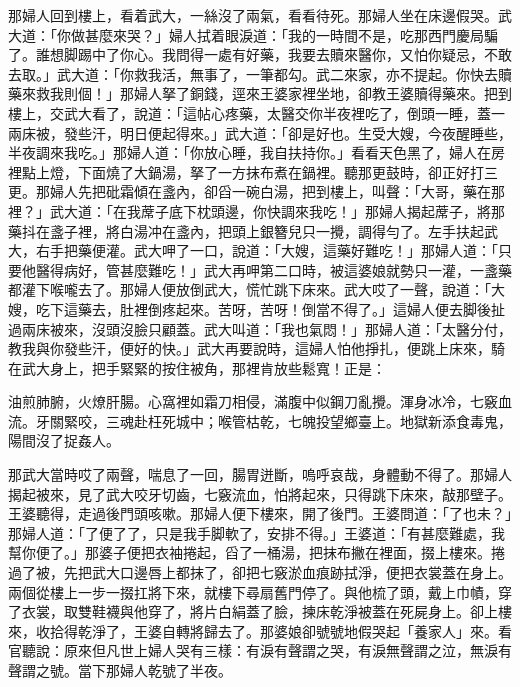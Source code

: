 那婦人回到樓上，看着武大，一絲沒了兩氣，看看待死。那婦人坐在床邊假哭。武大道：「你做甚麼來哭？」婦人拭着眼淚道：「我的一時間不是，吃那西門慶局騙了。誰想脚踢中了你心。我問得一處有好藥，我要去贖來醫你，又怕你疑忌，不敢去取。」武大道：「你救我活，無事了，一筆都勾。武二來家，亦不提起。你快去贖藥來救我則個！」那婦人拏了銅錢，逕來王婆家裡坐地，卻教王婆贖得藥來。把到樓上，交武大看了，說道：「這帖心疼藥，太醫交你半夜裡吃了，倒頭一睡，蓋一兩床被，發些汗，明日便起得來。」武大道：「卻是好也。生受大嫂，今夜醒睡些，半夜調來我吃。」{}那婦人道：「你放心睡，我自扶持你。」{}看看天色黑了，婦人在房裡點上燈，下面燒了大鍋湯，拏了一方抹布煮在鍋裡。聽那更鼓時，卻正好打三更。那婦人先把砒霜傾在盞內，卻舀一碗白湯，把到樓上，叫聲：「大哥，藥在那裡？」武大道：「在我蓆子底下枕頭邊，你快調來我吃！」{}那婦人揭起蓆子，將那藥抖在盞子裡，將白湯冲在盞內，把頭上銀簪兒只一攪，調得勻了。左手扶起武大，右手把藥便灌。武大呷了一口，說道：「大嫂，這藥好難吃！」那婦人道：「只要他醫得病好，{}管甚麼難吃！」武大再呷第二口時，被這婆娘就勢只一灌，一盞藥都灌下喉嚨去了。那婦人便放倒武大，慌忙跳下床來。武大哎了一聲，說道：「大嫂，吃下這藥去，肚裡倒疼起來。苦呀，苦呀！倒當不得了。」這婦人便去脚後扯過兩床被來，沒頭沒臉只顧蓋。武大叫道：「我也氣悶！」那婦人道：「太醫分付，教我與你發些汗，便好的快。」武大再要說時，這婦人怕他掙扎，便跳上床來，騎在武大身上，把手緊緊的按住被角，那裡肯放些鬆寬！正是：

\begin{myquote} 
油煎肺腑，火燎肝腸。心窩裡如霜刀相侵，滿腹中似鋼刀亂攪。渾身冰冷，七竅血流。牙關緊咬，三魂赴枉死城中；喉管枯乾，七魄投望鄉臺上。地獄新添食毒鬼，陽間沒了捉姦人。
\end{myquote} 

那武大當時哎了兩聲，喘息了一回，腸胃迸斷，嗚呼哀哉，身體動不得了。那婦人揭起被來，見了武大咬牙切齒，七竅流血，怕將起來，只得跳下床來，敲那壁子。王婆聽得，走過後門頭咳嗽。那婦人便下樓來，開了後門。王婆問道：「了也未？」那婦人道：「了便了了，只是我手脚軟了，安排不得。」王婆道：「有甚麼難處，我幫你便了。」那婆子便把衣袖捲起，舀了一桶湯，把抹布撇在裡面，掇上樓來。捲過了被，先把武大口邊唇上都抹了，卻把七竅淤血痕跡拭淨，便把衣裳蓋在身上。兩個從樓上一步一掇扛將下來，就樓下尋扇舊門停了。與他梳了頭，戴上巾幘，穿了衣裳，取雙鞋襪與他穿了，將片白絹蓋了臉，揀床乾淨被蓋在死屍身上。卻上樓來，收拾得乾淨了，王婆自轉將歸去了。那婆娘卻號號地假哭起「養家人」來。看官聽說：原來但凡世上婦人哭有三樣：有淚有聲謂之哭，有淚無聲謂之泣，無淚有聲謂之號。當下那婦人乾號了半夜。

